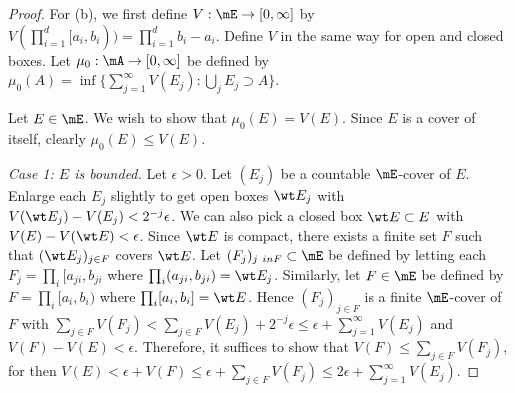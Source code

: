 \documentclass{article}
\begin{document}
\begin{proof}
For (b), we first define $V : \mE \to [0, \infty]$ by $V(\prod_{i=1}^d [a_i, b_i)) = \prod_{i=1}^d b_i - a_i$. Define $V$ in the same way for open and closed boxes.
Let $\mu_0: \mA \to [0, \infty]$ be defined by $\mu_0(A) = \inf \{\sum_{j=1}^\infty V(E_j) : \bigcup_j E_j \supset A \}$.

Let $E \in \mE$.  We wish to show that $\mu_0(E) = V(E)$. Since $E$ is a cover of itself, clearly $\mu_0(E) \le V(E)$.

\emph{Case 1: $E$ is bounded.} Let $\epsilon > 0$.  Let $(E_j)$ be a countable $\mE$-cover of $E$.  Enlarge each $E_j$ slightly to get open boxes $\wt E_j$ with $V(\wt E_j) - V(E_j) < 2^{-j} \epsilon$.  We can also pick a closed box $\wt E \subset E$ with $V(E) - V(\wt E) < \epsilon$. Since $\wt E$ is compact, there exists a finite set $F$ such that $(\wt E_j)_{j \in F}$ covers $\wt E$.  Let $(F_j)_{j\ in F} \subset \mE$ be defined by letting each $F_j = \prod_i [a_{ji}, b_{ji}$ where $\prod_i (a_{ji}, b_{ji}) = \wt E_j$.  Similarly, let $F \in \mE$ be defined by $F = \prod_i [a_i, b_i)$ where $\prod_i [a_i, b_i] = \wt E$.  Hence $(F_j)_{j \in F}$ is a finite $\mE$-cover of $F$ with $\sum_{j\in F} V(F_j) < \sum_{j\in F} V(E_j) + 2^{-j} \epsilon \le \epsilon + \sum_{j=1}^\infty V(E_j)$ and $V(F) - V(E) < \epsilon$.  Therefore, it suffices to show that $V(F) \le \sum_{j \in F} V(F_j)$, for then $V(E) < \epsilon + V(F) \le \epsilon + \sum_{j \in F} V(F_j)  \le 2 \epsilon + \sum_{j=1}^\infty V(E_j)$.





\end{proof}
\end{document}
